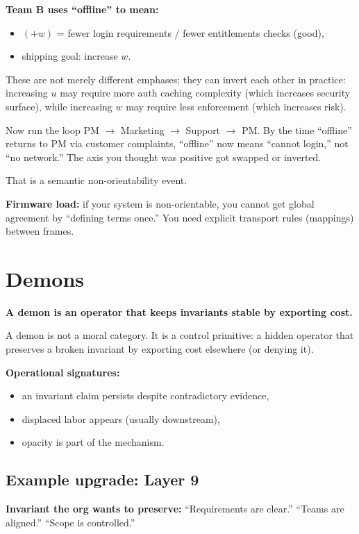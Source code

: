 \documentclass[11pt]{article}
\begin{document}
\textbf{Team B uses ``offline'' to mean:}
\begin{itemize}[leftmargin=2em]
  \item $(+w)$ = fewer login requirements / fewer entitlements checks (good),
  \item shipping goal: increase $w$.
\end{itemize}

These are not merely different emphases; they can invert each other in practice: increasing $u$ may require more auth caching complexity (which increases security surface), while increasing $w$ may require less enforcement (which increases risk).

Now run the loop PM $\rightarrow$ Marketing $\rightarrow$ Support $\rightarrow$ PM. By the time ``offline'' returns to PM via customer complaints, ``offline'' now means ``cannot login,'' not ``no network.'' The axis you thought was positive got swapped or inverted.

That is a semantic non-orientability event.

\textbf{Firmware load:} if your system is non-orientable, you cannot get global agreement by ``defining terms once.'' You need explicit transport rules (mappings) between frames.

\section{Demons}

\textbf{A demon is an operator that keeps invariants stable by exporting cost.}

A demon is not a moral category. It is a control primitive: a hidden operator that preserves a broken invariant by exporting cost elsewhere (or denying it).

\textbf{Operational signatures:}
\begin{itemize}[leftmargin=2em]
  \item an invariant claim persists despite contradictory evidence,
  \item displaced labor appears (usually downstream),
  \item opacity is part of the mechanism.
\end{itemize}

\subsection{Example upgrade: Layer 9}

\textbf{Invariant the org wants to preserve:} ``Requirements are clear.'' ``Teams are aligned.'' ``Scope is controlled.''
\end{document}
